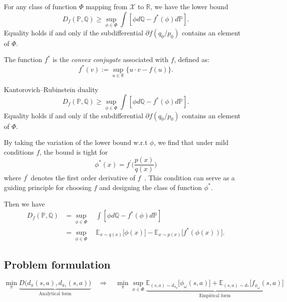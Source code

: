 \begin{lemma}
\citep{nguyen2010estimating} For any class of function $\Phi$ mapping from $\mathcal{X}$ to $\mathbb{R}$, we have the lower bound
\begin{equation*}
D_{f} (\mathbb{P}, \mathbb{Q}) \geq \sup_{\phi\in \Phi} \int [\phi d\mathbb{Q} - f^*(\phi) d\mathbb{P} ] . 
\end{equation*}
Equality holds if and only if the subdifferential $\partial f(q_0/p_0)$ contains an element of $\Phi$. 
\end{lemma}
The function $f^*$ is the \textit{convex conjugate} associated with $f$, defined as:
\begin{equation*}
f^*(v) := \sup_{u\in\mathbb{R}} \{ u \cdot v - f(u) \}. 
\end{equation*}

\begin{lemma}
\citep{villani2008optimal} Kantorovich–Rubinstein duality
\begin{equation*}
D_{f} (\mathbb{P}, \mathbb{Q}) \geq \sup_{\phi\in \Phi} \int [\phi d\mathbb{Q} - f^*(\phi) d\mathbb{P} ] . 
\end{equation*}
Equality holds if and only if the subdifferential $\partial f(q_0/p_0)$ contains an element of $\Phi$. 
\end{lemma}

By taking the variation of the lower bound w.r.t $\phi$, we find that under mild conditions $f$, the bound is tight for 
\begin{equation*}
\phi^*(x) = f^\prime \Big( \frac{p(x)}{q(x)} \Big)
\end{equation*}
where $f^\prime$ denotes the first order derivative of $f$~\citep{nowozin2016f}. This condition can serve as a guiding principle for choosing $f$ and designing the class of function $\phi^*$. 

Then we have 
\begin{align*}
D_f (\mathbb{P}, \mathbb{Q}) &= \sup_{\phi\in \Phi} \quad \int [\phi d\mathbb{Q} - f^*(\phi)d\mathbb{P}] \\
&= \sup_{\phi\in\Phi} \quad \mathbb{E}_{x\sim q(x)} \big[ \phi(x) \big] - \mathbb{E}_{x\sim p(x)} \big[ f^*(\phi(x)) \big].
\end{align*}

\subsection{Problem formulation}
\begin{equation*}
\min_{\pi} \underbrace{D\big(d_{\pi}(s, a), d_{\pi_*}(s, a)\big)}_{\text{Analytical form}} \quad \Rightarrow \quad \min_{\pi} \sup_{\phi\in\Phi} \underbrace{ \mathbb{E}_{(s, a)\sim d_{\pi_{\theta}}} \big[ \phi_{\omega}(s, a) \big] + \mathbb{E}_{(s, a)\sim d_*} \big[ f_{\phi_{\omega}}(s, a) \big]}_{\text{Empirical form}}
\end{equation*}

